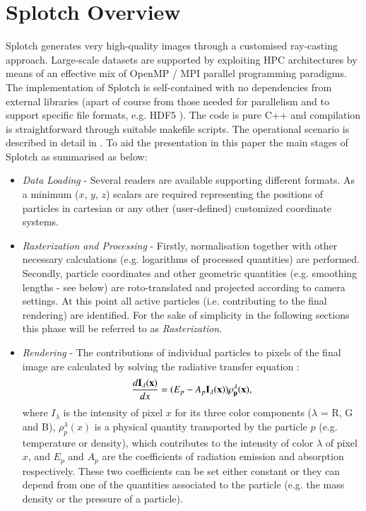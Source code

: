 \documentclass[1p]{elsarticle}
\begin{document}
\section{Splotch Overview}
\label{sec:overview}

Splotch generates very high-quality images through a customised ray-casting approach. Large-scale datasets are supported by exploiting HPC architectures by means of an effective mix of OpenMP / MPI parallel programming paradigms.  
The implementation of Splotch is self-contained with no dependencies from external libraries (apart of course from those needed for parallelism and to support specific file formats, e.g. HDF5 \cite{hdf5}). The code is pure C++ and compilation is straightforward through suitable makefile scripts. The operational scenario is described in detail in \cite{2008NJPh...10l5006D}. To aid the presentation in this paper the main stages of Splotch as summarised as below:
\begin{itemize}
\item
{\it Data Loading} - Several readers are available supporting different formats. As a minimum ($x$, $y$, $z$) scalars are required representing the positions of particles in cartesian or any other (user-defined) customized coordinate systems.
\item
{\it Rasterization and Processing} - Firstly, normalisation together with other necessary 
calculations (e.g. logarithms of processed quantities) are performed. Secondly, particle 
coordinates and other geometric quantities (e.g. smoothing lengths - see below) are 
roto-translated and projected according to camera settings. 
At this point all active 
particles (i.e. contributing to the final rendering) are identified.
For the sake of simplicity in the following sections 
this phase will be referred to as {\it Rasterization}.
\item
{\it Rendering} - The contributions of individual particles to pixels of the final 
image are calculated by solving the radiative transfer equation  \cite{1991par..book.....S}:
\begin{equation}\label{rad}
\frac{d\bf{I_{\lambda}}(x)}{dx}=(E_p-A_p\bf{I_{\lambda}}(x))\rho_p^{\lambda}(x),
\end{equation}
where $I_{\lambda}$ is the intensity of pixel $x$ for its three color components ($\lambda$ = R, G and B), $\rho_p^{\lambda}(x)$ is a physical quantity transported by the particle $p$ 
(e.g. temperature or density),
which contributes to the intensity of color $\lambda$ of pixel $x$, and $E_p$ and $A_p$
are the coefficients of radiation emission and absorption respectively. These two coefficients 
can be set either constant or they can depend from one of the quantities associated 
to the particle (e.g. the mass density or the pressure of a particle). 
\end{itemize}
\end{document}
